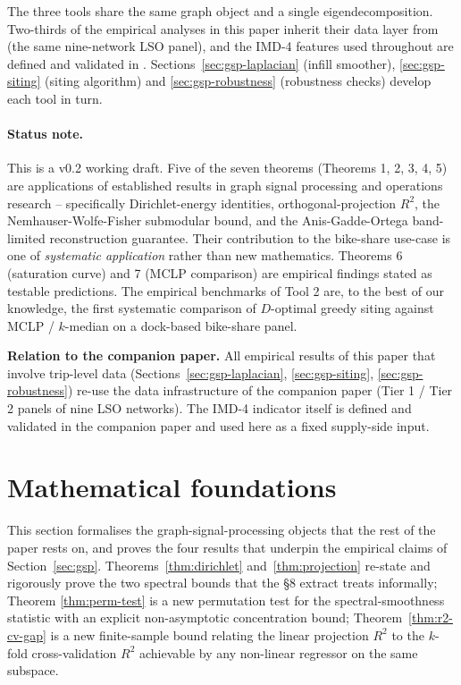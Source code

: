 \documentclass[11pt,a4paper]{article}
\newcommand{\1}{\mathbb{1}}
\theoremstyle{plain}
\theoremstyle{definition}
\theoremstyle{remark}
\begin{document}
The three tools share the same graph object and a single
eigendecomposition.  Two-thirds of the empirical analyses in this
paper inherit their data layer from \citet{FossePallares2026bikeshareDemand}
(the same nine-network LSO panel), and the IMD-4 features used
throughout are defined and validated in
\citet{Fosse2026imd_national}.  Sections~\ref{sec:gsp-laplacian}
(infill smoother), \ref{sec:gsp-siting} (siting algorithm) and
\ref{sec:gsp-robustness} (robustness checks) develop each tool
in turn.

\paragraph{Status note.}
This is a v0.2 working draft.  Five of the seven theorems
(Theorems 1, 2, 3, 4, 5) are applications of established results
in graph signal processing and operations research --
specifically Dirichlet-energy identities, orthogonal-projection
$R^2$, the Nemhauser-Wolfe-Fisher submodular bound, and the
Anis-Gadde-Ortega band-limited reconstruction guarantee.  Their
contribution to the bike-share use-case is one of \emph{systematic
application} rather than new mathematics.  Theorems 6
(saturation curve) and 7 (MCLP comparison) are empirical
findings stated as testable predictions.  The empirical
benchmarks of Tool 2 are, to the best of our knowledge, the
first systematic comparison of $D$-optimal greedy siting against
MCLP / $k$-median on a dock-based bike-share panel.

\textbf{Relation to the companion paper.}  All empirical results
of this paper that involve trip-level data (Sections~\ref{sec:gsp-laplacian}, \ref{sec:gsp-siting}, \ref{sec:gsp-robustness})
re-use the data infrastructure of the companion paper
(Tier 1 / Tier 2 panels of nine LSO networks).  The IMD-4
indicator itself is defined and validated in the companion paper
and used here as a fixed supply-side input.

\section{Mathematical foundations}
\label{sec:math}

This section formalises the graph-signal-processing objects that
the rest of the paper rests on, and proves the four results that
underpin the empirical claims of
Section~\ref{sec:gsp}.  Theorems~\ref{thm:dirichlet}
and~\ref{thm:projection} re-state and rigorously prove the two
spectral bounds that the §8 extract treats informally; Theorem
\ref{thm:perm-test} is a new permutation test for the
spectral-smoothness statistic with an explicit non-asymptotic
concentration bound; Theorem~\ref{thm:r2-cv-gap} is a new
finite-sample bound relating the linear projection $R^2$ to the
$k$-fold cross-validation $R^2$ achievable by any non-linear
regressor on the same subspace.
\end{document}
